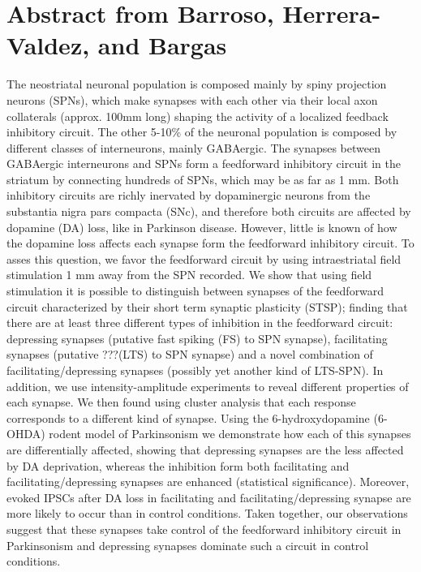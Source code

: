 \documentclass[11pt,landscape]{article}
\begin{document}
\newpage
\section{Abstract from Barroso, Herrera-Valdez, and Bargas}
The neostriatal neuronal population is composed mainly by spiny projection
neurons (SPNs), which make synapses with each other via their local
axon collaterals (approx. 100mm long) shaping the activity of a localized feedback
inhibitory circuit. The other 5-10\% of the neuronal population is
composed by different classes of interneurons, mainly
GABAergic. The synapses between GABAergic interneurons and SPNs form a
feedforward inhibitory circuit in the striatum by connecting hundreds
of SPNs, which may be as far as 1 mm. Both inhibitory circuits are richly inervated
by dopaminergic neurons from the substantia nigra pars compacta (SNc),
and therefore both circuits are affected by dopamine (DA) loss, like
in Parkinson disease. However, little is known of how the dopamine
loss affects each synapse form the feedforward inhibitory circuit. To
asses this question, we favor the feedforward circuit by using
intraestriatal field stimulation 1 mm away from the SPN recorded. We
show that using field stimulation it is possible to distinguish
between synapses of the feedforward circuit characterized by their
short term synaptic plasticity (STSP); finding that there are at least
three different types of inhibition in the feedforward circuit:
depressing synapses (putative fast spiking (FS) to SPN synapse),
facilitating synapses (putative ???(LTS) to SPN synapse) and a novel
combination of facilitating/depressing synapses (possibly yet another kind
of LTS-SPN). In addition, we use intensity-amplitude experiments to
reveal different properties of each synapse. We then found using
cluster analysis that
each response corresponds to a different kind
of synapse. Using the 6-hydroxydopamine (6-OHDA) rodent model of
Parkinsonism we demonstrate how each of this synapses are
differentially affected, showing that depressing synapses are the less
affected by DA deprivation, whereas the inhibition form both
facilitating and facilitating/depressing synapses are enhanced
(statistical significance).  Moreover, evoked IPSCs after DA loss in
facilitating and facilitating/depressing synapse are more likely to occur than
in control conditions. Taken together, our observations  suggest that
these synapses take control of the feedforward 
inhibitory circuit in Parkinsonism and depressing synapses dominate
such a circuit in control conditions.



\end{document}
